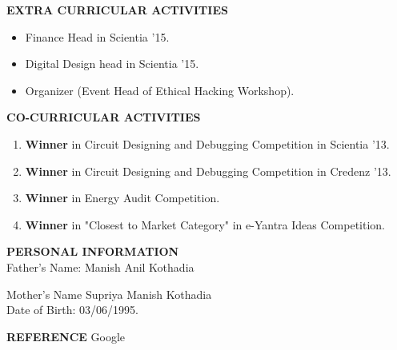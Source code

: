 \documentclass[]{article}
\begin{document}
\begin{flushleft}
\vspace{0.15in}
{\large \bf EXTRA CURRICULAR ACTIVITIES}
\begin{itemize}
\hspace{0.5in}
\vspace{-0.22in}
\addtolength{\itemindent}{1in}
\item Finance Head in Scientia '15.
\item Digital Design head in Scientia '15.
\item Organizer (Event Head of Ethical Hacking Workshop).
\end{itemize}
\end{flushleft}


\begin{flushleft}
\vspace{0.15in}
{\large \bf CO-CURRICULAR ACTIVITIES}
\begin{enumerate}
\hspace{0.5in}
\vspace{-0.22in}
\addtolength{\itemindent}{1in}
\item {\bf Winner} in Circuit Designing and Debugging Competition in Scientia '13.
\item {\bf Winner} in Circuit Designing and Debugging Competition in Credenz '13.
\item {\bf Winner} in Energy Audit Competition.
\item {\bf Winner} in "Closest to Market Category" in e-Yantra Ideas Competition. 
\end{enumerate}
\end{flushleft}


\begin{flushleft}
\vspace{0.15in}
{\large \bf PERSONAL INFORMATION}\\
\vspace{0.15in}
Father's Name:
\hspace{0.5in}
Manish Anil Kothadia
\vspace{0.15in}


Mother's Name
\hspace{0.5in}
Supriya Manish Kothadia\\
\vspace{0.15in}
Date of Birth:
\hspace{0.5in}
03/06/1995.
\end{flushleft}


\begin{flushleft}
\vspace{0.15in}
{\large \bf REFERENCE}
\hspace{0.2in}
Google
\end{flushleft}
\end{document}

